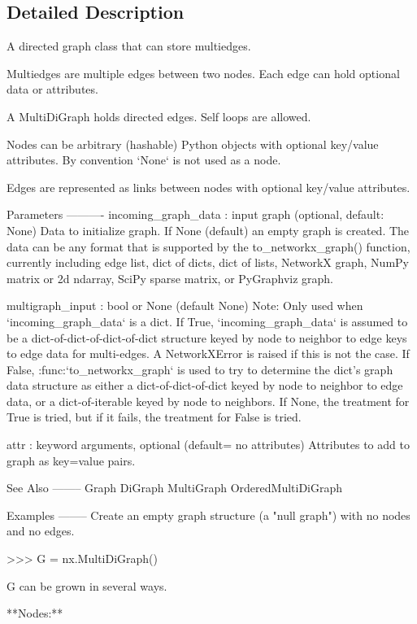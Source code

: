 \subsection{Detailed Description}
\begin{DoxyVerb}A directed graph class that can store multiedges.

Multiedges are multiple edges between two nodes.  Each edge
can hold optional data or attributes.

A MultiDiGraph holds directed edges.  Self loops are allowed.

Nodes can be arbitrary (hashable) Python objects with optional
key/value attributes. By convention `None` is not used as a node.

Edges are represented as links between nodes with optional
key/value attributes.

Parameters
----------
incoming_graph_data : input graph (optional, default: None)
    Data to initialize graph. If None (default) an empty
    graph is created.  The data can be any format that is supported
    by the to_networkx_graph() function, currently including edge list,
    dict of dicts, dict of lists, NetworkX graph, NumPy matrix
    or 2d ndarray, SciPy sparse matrix, or PyGraphviz graph.

multigraph_input : bool or None (default None)
    Note: Only used when `incoming_graph_data` is a dict.
    If True, `incoming_graph_data` is assumed to be a
    dict-of-dict-of-dict-of-dict structure keyed by
    node to neighbor to edge keys to edge data for multi-edges.
    A NetworkXError is raised if this is not the case.
    If False, :func:`to_networkx_graph` is used to try to determine
    the dict's graph data structure as either a dict-of-dict-of-dict
    keyed by node to neighbor to edge data, or a dict-of-iterable
    keyed by node to neighbors.
    If None, the treatment for True is tried, but if it fails,
    the treatment for False is tried.

attr : keyword arguments, optional (default= no attributes)
    Attributes to add to graph as key=value pairs.

See Also
--------
Graph
DiGraph
MultiGraph
OrderedMultiDiGraph

Examples
--------
Create an empty graph structure (a "null graph") with no nodes and
no edges.

>>> G = nx.MultiDiGraph()

G can be grown in several ways.

**Nodes:**


\end{DoxyVerb}
